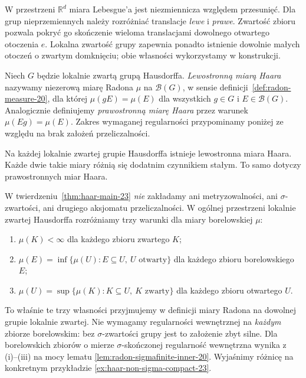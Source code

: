 \begin{uwaga}
W przestrzeni $\mathbb R^d$ miara Lebesgue'a jest niezmiennicza
względem przesunięć. Dla grup nieprzemiennych należy rozróżniać
translacje \emph{lewe} i \emph{prawe}. Zwartość zbioru pozwala pokryć go skończenie wieloma
translacjami dowolnego otwartego otoczenia $e$.
Lokalna zwartość grupy zapewnia ponadto istnienie dowolnie
małych otoczeń o zwartym domknięciu; obie własności
wykorzystamy w konstrukcji.
\end{uwaga}

\begin{definicja}
\label{def:haar-23}
Niech $G$ będzie lokalnie zwartą grupą Hausdorffa.
\emph{Lewostronną miarą Haara} nazywamy niezerową miarę Radona
$\mu$ na $\mathcal B(G)$, w sensie definicji~\ref{def:radon-measure-20},
dla której $\mu(gE)=\mu(E)$ dla wszystkich $g\in G$
i $E\in\mathcal B(G)$. Analogicznie definiujemy
\emph{prawostronną miarę Haara} przez warunek
$\mu(Eg)=\mu(E)$. Zakres wymaganej regularności
przypominamy poniżej ze względu na brak założeń przeliczalności.
\end{definicja}

\begin{twierdzenie}
\label{thm:haar-main-23}
Na każdej lokalnie zwartej grupie Hausdorffa istnieje
lewostronna miara Haara. Każde dwie takie miary różnią się
dodatnim czynnikiem stałym. To samo dotyczy prawostronnych miar
Haara.
\end{twierdzenie}

\begin{uwaga}
W twierdzeniu~\ref{thm:haar-main-23} \emph{nie} zakładamy ani
metryzowalności, ani $\sigma$-zwartości, ani drugiego aksjomatu przeliczalności.
W ogólnej przestrzeni lokalnie zwartej Hausdorffa rozróżniamy
trzy warunki dla miary borelowskiej $\mu$:
\begin{enumerate}[label=(\roman*)]
\item $\mu(K)<\infty$ dla każdego zbioru zwartego $K$;
\item $\mu(E)=\inf\{\mu(U):E\subseteq U,\ U\text{ otwarty}\}$
      dla każdego zbioru borelowskiego $E$;
\item $\mu(U)=\sup\{\mu(K):K\subseteq U,\ K\text{ zwarty}\}$
      dla każdego zbioru otwartego $U$.
\end{enumerate}
To właśnie te trzy własności przyjmujemy w definicji miary Radona
na dowolnej grupie lokalnie zwartej. Nie wymagamy regularności
wewnętrznej na \emph{każdym} zbiorze borelowskim: bez
$\sigma$-zwartości grupy jest to założenie zbyt silne.
Dla borelowskich zbiorów o mierze $\sigma$-skończonej
regularność wewnętrzna wynika z (i)--(iii) na mocy
lematu \ref{lem:radon-sigmafinite-inner-20}.
Wyjaśnimy różnicę na konkretnym przykładzie
\ref{ex:haar-non-sigma-compact-23}.
\end{uwaga}

